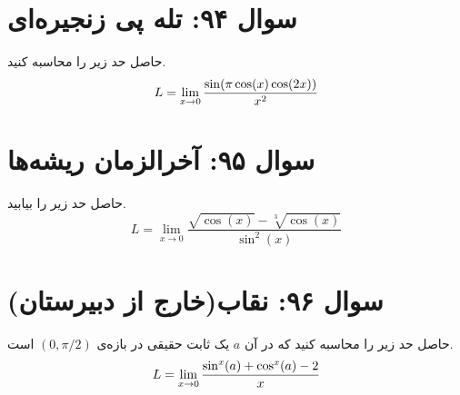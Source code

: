 \documentclass[12pt]{article}
\begin{document}
\section*{سوال ۹۴: تله پی زنجیره‌ای}
حاصل حد زیر را محاسبه کنید.
\begin{displaymath}
	\Large L = \lim_{x \to 0} \frac{\sin(\pi \cos(x)\cos(2x))}{x^2}
\end{displaymath}



\vspace{1cm}
\hrulefill
\vspace{1cm}

\section*{سوال ۹۵: آخرالزمان ریشه‌ها}
حاصل حد زیر را بیابید.
\begin{displaymath}
	 L = \lim_{x \to 0} \frac{\sqrt{\cos(x)} - \sqrt[3]{\cos(x)}}{\sin^2(x)}
\end{displaymath}



\vspace{1cm}
\hrulefill
\vspace{1cm}

\section*{سوال ۹۶: نقاب(خارج از دبیرستان)}
حاصل حد زیر را محاسبه کنید که در آن \(a\) یک ثابت حقیقی در بازه‌ی \((0, \pi/2)\) است.
\begin{displaymath}
	\Large L = \lim_{x \to 0} \frac{\sin^x(a) + \cos^x(a) - 2}{x}
\end{displaymath}



\vspace{1cm}
\hrulefill
\vspace{1cm}

\end{document}
